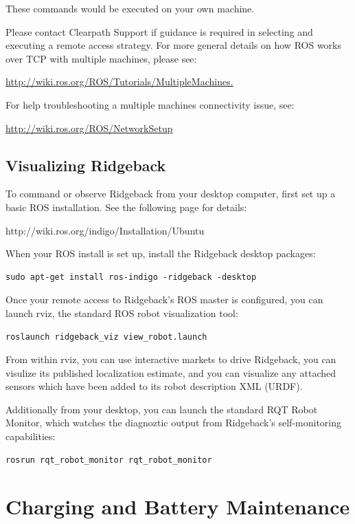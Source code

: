 \documentclass[]{clearpath-latex/clearpath-manual}
\begin{document}
These commands would be executed on your own machine.

Please contact Clearpath Support if guidance is required in selecting and executing a remote access strategy.
For more general details on how ROS works over TCP with multiple machines, please see:

\url{http://wiki.ros.org/ROS/Tutorials/MultipleMachines.}

For help troubleshooting a multiple machines connectivity issue, see:

\url{http://wiki.ros.org/ROS/NetworkSetup}


\subsection{Visualizing Ridgeback}

To command or observe Ridgeback from your desktop computer, first set up a basic ROS installation.  See the following page for details:

http://wiki.ros.org/indigo/Installation/Ubuntu

When your ROS install is set up, install the Ridgeback desktop packages:

\begin{lstlisting}
sudo apt-get install ros-indigo -ridgeback -desktop
\end{lstlisting}

Once your remote access to Ridgeback's ROS master is configured, you can launch rviz, the standard ROS robot visualization tool:

\begin{lstlisting}
roslaunch ridgeback_viz view_robot.launch
\end{lstlisting}

From within rviz, you can use interactive markets to drive Ridgeback, you can visulize its published localization estimate, and you can visualize any attached sensors which have been added to its robot description XML (URDF).  

Additionally from your desktop, you can launch the standard RQT Robot Monitor, which watches the diagnoztic output from Ridgeback's self-monitoring capabilities:

\begin{lstlisting}
rosrun rqt_robot_monitor rqt_robot_monitor
\end{lstlisting}

\section{Charging and Battery Maintenance}
\end{document}
